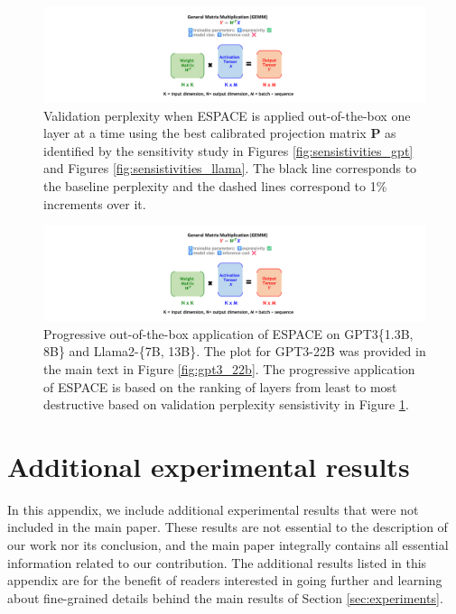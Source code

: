 \documentclass{article}
\theoremstyle{plain}
\begin{document}
\begin{figure}[!t]
\begin{center}
    \includegraphics[trim=14cm 0.5cm 17.5cm 0.25cm, clip, width = 0.85\linewidth,page=16]{espace_paper_figures.pdf}
\end{center}
\caption{\footnotesize Validation perplexity when ESPACE is applied out-of-the-box one layer at a time using the best calibrated projection matrix $\mathbf{P}$ as identified by the sensitivity study in Figures \ref{fig:sensistivities_gpt} and Figures \ref{fig:sensistivities_llama}. The black line corresponds to the baseline perplexity and the dashed lines correspond to 1\% increments over it.}
\label{fig:best_per_layer}
\end{figure}
\begin{figure}[!t]
\begin{center}
    \includegraphics[trim=14cm 0cm 25cm 0.25cm, clip, width = 0.75\linewidth,page=17]{espace_paper_figures.pdf}
\end{center}
\caption{\footnotesize Progressive out-of-the-box application of ESPACE on GPT3\{1.3B, 8B\} and Llama2-\{7B, 13B\}. The plot for GPT3-22B was provided in the main text in Figure \ref{fig:gpt3_22b}. The progressive application of ESPACE is based on the ranking of layers from least to most destructive based on validation perplexity sensistivity in Figure \ref{fig:best_per_layer}.}
\label{fig:prog_sweeps}
\end{figure}
\section{Additional experimental results}
\label{app:additonal_exp}
In this appendix, we include additional experimental results that were not included in the main paper. These results are not essential to the description of our work nor its conclusion, and the main paper integrally contains all essential information related to our contribution. The additional results listed in this appendix are for the benefit of readers interested in going further and learning about fine-grained details behind the main results of Section \ref{sec:experiments}.
\end{document}
